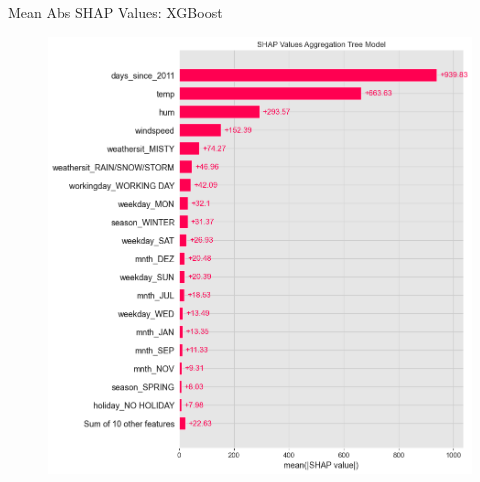 \documentclass[10pt]{beamer}
\begin{document}
\begin{frame}{Mean Abs SHAP Values: XGBoost}
\begin{center}
  \begin{figure}
    \includegraphics[scale=0.3]{images/interpretable_ml_128_0.png}
  \end{figure}
\end{center}
\end{frame}
\end{document}

